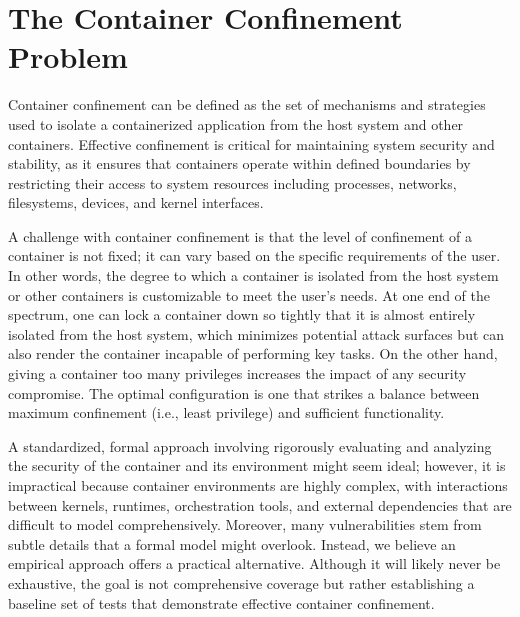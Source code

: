 \section{The Container Confinement Problem}
\label{sec:container-confinment-problem}


Container confinement can be defined as the set of mechanisms and strategies used to isolate a containerized application from the host system and other containers. Effective confinement is critical for maintaining system security and stability, as it ensures that containers operate within defined boundaries by restricting their access to system resources including processes, networks, filesystems, devices, and kernel interfaces. 

A challenge with container confinement is that the level of confinement of a container is not fixed; it can vary based on the specific requirements of the user. In other words, the degree to which a container is isolated from the host system or other containers is customizable to meet the user's needs. At one end of the spectrum, one can lock a container down so tightly that it is almost entirely isolated from the host system, which minimizes potential attack surfaces but can also render the container incapable of performing key tasks. On the other hand, giving a container too many privileges increases the impact of any security compromise. The optimal configuration is one that strikes a balance between maximum confinement (i.e., least privilege) and sufficient functionality. 

A standardized, formal approach involving rigorously evaluating and analyzing the security of the container and its environment might seem ideal; however, it is impractical because container environments are highly complex, with interactions between kernels, runtimes, orchestration tools, and external dependencies that are difficult to model comprehensively. Moreover, many vulnerabilities stem from subtle details that a formal model might overlook. Instead, we believe an empirical approach offers a practical alternative. Although it will likely never be exhaustive, the goal is not comprehensive coverage but rather establishing a baseline set of tests that demonstrate effective container confinement.


